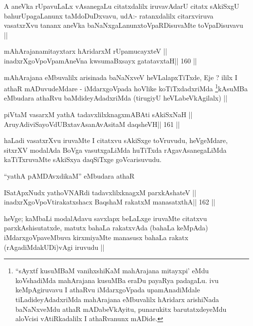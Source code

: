 \begin{artha}
A aneVka rUpavuLaLx vAsanegaLu citatxdalilx iruvavAdarU citatx
sAkiSxgU bahurUpagaLanunx taMdoDuDxvavu, udA:- ratanxdalilx
citarxviruva vasatxrXvu tananx aneVka baNaNxgaLanunxtoVpaRDisuvaMte
toVpaDisuvavu ||
\end{artha}

\begin{shl}
mAhArajanamitayxtarx hAridarxM rUpamucayxteV ||
\footnotemark[1]inadxrXgoVpoVpamAneVna kwsumaBxsayx gatatavxtaH\hfill || 160 ||
\end{shl}

\begin{artha}
mAhArajana eMbuvalilx arisinada baNaNxveV heVLalapxTiTxde, Eje ? ililx
I athaR mADuvudeMdare - iMdarxgoVpada hoVlike
koTiTxdadxriMda \footnote[1]{``sAyxtf kusuMBaM vanihxshiKaM mahArajana
mitayxpi' eMdu koVshadiMda mahArajana kusuMBa eraDu payaRya
padagaLu. ivu keMpAgiruvavu I athaRvu iMdarxgoVpada upamAnadiMdale
tiLadideyAdadxriMda mahArajana eMbuvalilx hAridarx arishiNada
baNaNxveMdu athaR mADabeVkAyitu, punarukitx barutatxdeyeMdu aloVcisi
vAtiRkadalilx I athaRvanunx mADide.}kAsuMBa eMbudara athaRvu
baMdideyAdadxriMda (tirugiyU heVLabeVkAgilalx) ||
\end{artha}

\begin{shl}
piVtaM vasarxM yathA tadavxlilxknagxmABAti sAkiSxNaH ||
AruyAdiviSayoVdUBxtavAsanAvAsitaM daqsheVH\hfill || 161 ||
\end{shl}

\begin{artha}
haLadi vasatxrXvu iruvaMte I citatxvu sAkiSxge toVruvudu, heVgeMdare,
sitxrXV modalAda BoVga vasutxgaLiMda huTiTxda rAgavAsanegaLiMda
kaTiTxruvaMte sAkiSxya daqSiTxge goVcarisuvudu.

``yathA pAMDAvxdikaM'' eMbudara athaR 
\end{artha}

\begin{shl}
ISatApxNudx yathoVNARdi tadavxlilxknagxM parxkAshateV ||
inadxrXgoVpoV\s tirakatxshacx BaqshaM rakatxM manasatxthA\hfill || 162 ||
\end{shl}

\begin{artha}
heVge; kaMbaLi modalAdavu savxlapx beLaLxge iruvaMte citatxvu
parxkAshisutatxde, matutx bahaLa rakatxvAda (bahaLa keMpAda)
iMdarxgoVpaveMbuva kirxmiyaMte manasusx bahaLa rakatx
(rAgadiMdakUDi)vAgi iruvudu ||
\end{artha}


